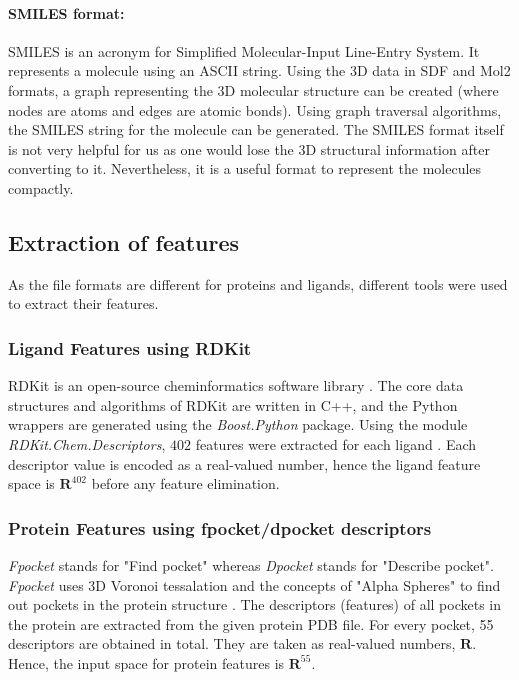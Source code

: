 \documentclass[11pt]{article}
\begin{document}
\paragraph{SMILES format:}
SMILES is an acronym for Simplified Molecular-Input Line-Entry System.
It represents a molecule using an ASCII string.
Using the 3D data in SDF and Mol2 formats, a graph representing the 3D molecular structure can be created (where nodes are atoms and edges are atomic bonds).
Using graph traversal algorithms, the SMILES string for the molecule can be generated.
The SMILES format itself is not very helpful for us as one would lose the 3D structural information after converting to it.
Nevertheless, it is a useful format to represent the molecules compactly.
\cite{smilesformat}

\subsection{Extraction of features}
As the file formats are different for proteins and ligands,  different tools were used to extract their features.
\subsubsection{Ligand Features using RDKit}
RDKit is an open-source cheminformatics software library \cite{rdkitofficalpage}.
The core data structures and algorithms of RDKit are written in C++, and the Python wrappers are generated using the \textit{Boost.Python} package.
Using the module \textit{RDKit.Chem.Descriptors}, $402$ features were extracted for each ligand \cite{rdkitbioinformaticsfreiburg}.
Each descriptor value is encoded as a real-valued number, hence the ligand feature space is $\mathbf{R}^{402}$ before any feature elimination.

\subsubsection{Protein Features using fpocket/dpocket descriptors}
\textit{Fpocket} stands for "Find pocket" whereas \textit{Dpocket} stands for "Describe pocket".
\textit{Fpocket} uses 3D Voronoi tessalation and the concepts of "Alpha Spheres" to find out pockets in the protein structure \cite{fpocketmanual} \cite{voronoitesselationshortvideo}.
The descriptors (features) of all pockets in the protein are extracted from the given protein PDB file.
For every pocket,  55 descriptors are obtained in total. They are taken as real-valued numbers, $\mathbf{R}$.
Hence, the input space for protein features is $\mathbf{R}^{55}$.
\end{document}
